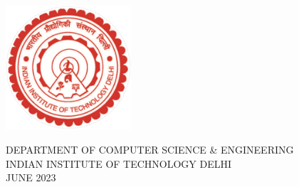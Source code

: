 \begin{titlepage}

\begin{center}


\LARGE
\MakeUppercase{\textbf{\ThesisTitle{}}}\\

\vspace{4cm}

\LARGE

\MakeUppercase{\textbf{\Auth{}}}

\vspace{2.5cm}
\hspace{0cm}
\hbox{\includegraphics[width=11pc]{rest/iitd_logo.pdf}}
\vspace{1cm}

\large{DEPARTMENT OF COMPUTER SCIENCE \& ENGINEERING}\\
\large{INDIAN INSTITUTE OF TECHNOLOGY DELHI}\\
\large{JUNE 2023}\\

\end{center}

\end{titlepage}

